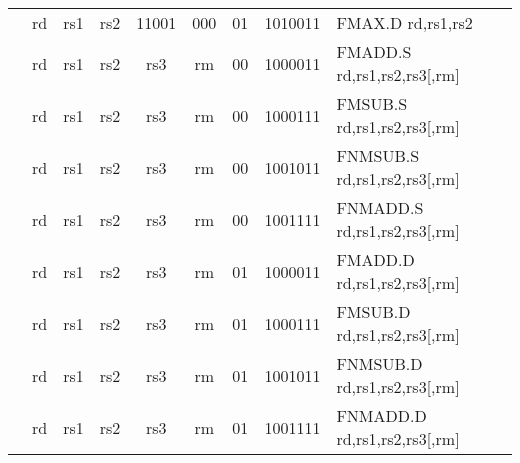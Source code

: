 \begin{table}[p]
\begin{small}
\begin{center}
\begin{tabular}{rccccccccccl}
&
\multicolumn{1}{|c|}{rd} &
\multicolumn{1}{c|}{rs1} &
\multicolumn{1}{c|}{rs2} &
\multicolumn{3}{c|}{11001} &
\multicolumn{2}{c|}{000} &
\multicolumn{1}{c|}{01} &
\multicolumn{1}{c|}{1010011} & FMAX.D rd,rs1,rs2 \\
\cline{2-11}
  

&
\multicolumn{1}{|c|}{rd} &
\multicolumn{1}{c|}{rs1} &
\multicolumn{1}{c|}{rs2} &
\multicolumn{3}{c|}{rs3} &
\multicolumn{2}{c|}{rm} &
\multicolumn{1}{c|}{00} &
\multicolumn{1}{c|}{1000011} & FMADD.S rd,rs1,rs2,rs3[,rm] \\
\cline{2-11}
  

&
\multicolumn{1}{|c|}{rd} &
\multicolumn{1}{c|}{rs1} &
\multicolumn{1}{c|}{rs2} &
\multicolumn{3}{c|}{rs3} &
\multicolumn{2}{c|}{rm} &
\multicolumn{1}{c|}{00} &
\multicolumn{1}{c|}{1000111} & FMSUB.S rd,rs1,rs2,rs3[,rm] \\
\cline{2-11}
  

&
\multicolumn{1}{|c|}{rd} &
\multicolumn{1}{c|}{rs1} &
\multicolumn{1}{c|}{rs2} &
\multicolumn{3}{c|}{rs3} &
\multicolumn{2}{c|}{rm} &
\multicolumn{1}{c|}{00} &
\multicolumn{1}{c|}{1001011} & FNMSUB.S rd,rs1,rs2,rs3[,rm] \\
\cline{2-11}
  

&
\multicolumn{1}{|c|}{rd} &
\multicolumn{1}{c|}{rs1} &
\multicolumn{1}{c|}{rs2} &
\multicolumn{3}{c|}{rs3} &
\multicolumn{2}{c|}{rm} &
\multicolumn{1}{c|}{00} &
\multicolumn{1}{c|}{1001111} & FNMADD.S rd,rs1,rs2,rs3[,rm] \\
\cline{2-11}
  

&
\multicolumn{1}{|c|}{rd} &
\multicolumn{1}{c|}{rs1} &
\multicolumn{1}{c|}{rs2} &
\multicolumn{3}{c|}{rs3} &
\multicolumn{2}{c|}{rm} &
\multicolumn{1}{c|}{01} &
\multicolumn{1}{c|}{1000011} & FMADD.D rd,rs1,rs2,rs3[,rm] \\
\cline{2-11}
  

&
\multicolumn{1}{|c|}{rd} &
\multicolumn{1}{c|}{rs1} &
\multicolumn{1}{c|}{rs2} &
\multicolumn{3}{c|}{rs3} &
\multicolumn{2}{c|}{rm} &
\multicolumn{1}{c|}{01} &
\multicolumn{1}{c|}{1000111} & FMSUB.D rd,rs1,rs2,rs3[,rm] \\
\cline{2-11}
  

&
\multicolumn{1}{|c|}{rd} &
\multicolumn{1}{c|}{rs1} &
\multicolumn{1}{c|}{rs2} &
\multicolumn{3}{c|}{rs3} &
\multicolumn{2}{c|}{rm} &
\multicolumn{1}{c|}{01} &
\multicolumn{1}{c|}{1001011} & FNMSUB.D rd,rs1,rs2,rs3[,rm] \\
\cline{2-11}
  

&
\multicolumn{1}{|c|}{rd} &
\multicolumn{1}{c|}{rs1} &
\multicolumn{1}{c|}{rs2} &
\multicolumn{3}{c|}{rs3} &
\multicolumn{2}{c|}{rm} &
\multicolumn{1}{c|}{01} &
\multicolumn{1}{c|}{1001111} & FNMADD.D rd,rs1,rs2,rs3[,rm] \\
\cline{2-11}
  

\end{tabular}
\end{center}
\end{small}

\label{instr-table}
\end{table}
  

